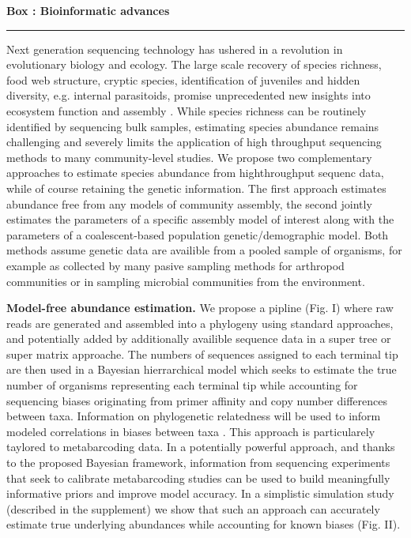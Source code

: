 \documentclass[12pt]{article}
\newcounter{Box}
\begin{document}
\noindent
\colorbox{gray!20}{
  \begin{minipage}{0.97\textwidth}
    \label{box:dry}
    \noindent
    {\bf \large Box \theBox: Bioinformatic advances} 
    \vspace{1pt}
    \hrule
    \vspace{1pt}

    Next generation sequencing technology has ushered in a revolution
    in evolutionary biology and ecology. The large scale recovery of
    species richness, food web structure, cryptic species,
    identification of juveniles and hidden diversity, e.g. internal
    parasitoids, promise unprecedented new insights into ecosystem
    function and assembly \citep[see Box
    \ref{box:wet};][]{krehenwinkel2016, shokralla2015, gibson2014,
      taberlet2012}. While species richness can be routinely
    identified by sequencing bulk samples, estimating species
    abundance remains challenging \citep{elbrecht2015} and severely
    limits the application of high throughput sequencing methods to
    many community-level studies. We propose two complementary
    approaches to estimate species abundance from highthroughput
    sequenc data, while of course retaining the genetic information.
    The first approach estimates abundance free from any models of
    community assembly, the second jointly estimates the parameters of
    a specific assembly model of interest along with the parameters of
    a coalescent-based population genetic/demographic model.  Both
    methods assume genetic data are availible from a pooled sample of
    organisms, for example as collected by many pasive sampling
    methods for arthropod communities or in sampling microbial
    communities from the environment.

    {\bf Model-free abundance estimation.} We propose a pipline
    (Fig. I) where raw reads are generated and assembled into a
    phylogeny using standard approaches, and potentially added by
    additionally availible sequence data in a super tree or super
    matrix approache. The numbers of sequences assigned to each
    terminal tip are then used in a Bayesian hierrarchical model which
    seeks to estimate the true number of organisms representing each
    terminal tip while accounting for sequencing biases originating
    from primer affinity and copy number differences between taxa.
    Information on phylogenetic relatedness will be used to inform
    modeled correlations in biases between taxa \citep[e.g. copy
    number is known to be phylogenetically conserved]{foo}. This
    approach is particularely taylored to metabarcoding data. In a
    potentially powerful approach, and thanks to the proposed Bayesian
    framework, information from sequencing experiments that seek to
    calibrate metabarcoding studies \citep[e.g.,][]{henrik} can be
    used to build meaningfully informative priors and improve model
    accuracy. In a simplistic simulation study (described in the
    supplement) we show that such an approach can accurately estimate
    true underlying abundances while accounting for known biases
    (Fig. II).


\end{minipage}}
\end{document}
